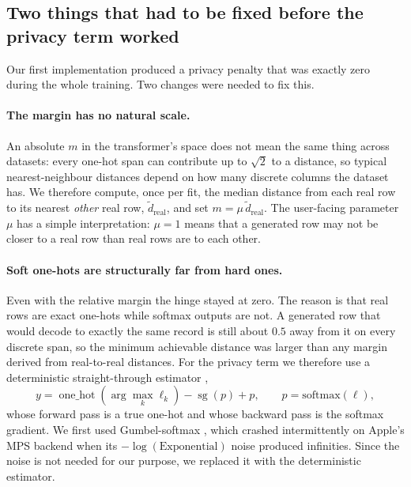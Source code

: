 \documentclass[11pt,a4paper]{article}
\begin{document}
\subsection{Two things that had to be fixed before the privacy term worked}
\label{sec:fixes}

Our first implementation produced a privacy penalty that was exactly zero
during the whole training. Two changes were needed to fix this.

\paragraph{The margin has no natural scale.}
An absolute $m$ in the transformer's space does not mean the same thing across
datasets: every one-hot span can contribute up to $\sqrt{2}$ to a distance, so
typical nearest-neighbour distances depend on how many discrete columns the
dataset has. We therefore compute, once per fit, the median distance from each
real row to its nearest \emph{other} real row, $\tilde d_{\text{real}}$, and
set $m = \mu\,\tilde d_{\text{real}}$. The user-facing parameter $\mu$ has a
simple interpretation: $\mu = 1$ means that a generated row may not be closer
to a real row than real rows are to each other.

\paragraph{Soft one-hots are structurally far from hard ones.}
Even with the relative margin the hinge stayed at zero. The reason is that
real rows are exact one-hots while softmax outputs are not. A generated row
that would decode to exactly the same record is still about $0.5$ away from it
on every discrete span, so the minimum achievable distance was larger than any
margin derived from real-to-real distances. For the privacy term we therefore
use a deterministic straight-through estimator \citep{bengio2013ste},
\begin{equation}
y = \operatorname{one\_hot}(\arg\max_k \ell_k) - \operatorname{sg}(p) + p,
\qquad p = \text{softmax}(\ell),
\end{equation}
whose forward pass is a true one-hot and whose backward pass is the softmax
gradient. We first used Gumbel-softmax \citep{jang2017gumbel}, which crashed
intermittently on Apple's MPS backend when its $-\log(\text{Exponential})$
noise produced infinities. Since the noise is not needed for our purpose, we
replaced it with the deterministic estimator.
\end{document}
